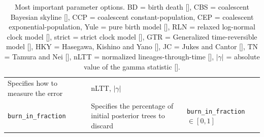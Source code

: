 \begin{table}
\begin{tabular}{|p{3.4cm}|p{9.7cm}|p{4.5cm}@{}|}
    Specifies how to measure the error &
    nLTT, $|\gamma|$ \\
    \verb;burn_in_fraction; &
    Specifies the percentage of initial posterior trees to discard &
    \verb;burn_in_fraction; $\in [0, 1]$\\
    \hline
  \end{tabular}
  \caption{
    Most important parameter options.
    BD = birth death [\cite{nee1994reconstructed}], 
    CBS = coalescent Bayesian skyline [\cite{drummond2005bayesian}], 
    CCP = coalescent constant-population, 
    CEP = coalescent exponential-population,
    Yule = pure birth model [\cite{yule}],
    RLN = relaxed log-normal clock model [\cite{drummond2006relaxed}],
    strict = strict clock model [\cite{zuckerkandl1965molecules}], 
    GTR = Generalized time-reversible model [\cite{tavare1986some}], 
    HKY = Hasegawa, Kishino and Yano [\cite{hasegawa1985dating}], 
    JC = Jukes and Cantor [\cite{jukes1969evolution}], 
    TN = Tamura and Nei [\cite{tamura1993estimation}],
    nLTT = normalized lineages-through-time [\cite{janzen2015approximate}],
    $|\gamma|$ = absolute value of the gamma statistic [\cite{pybus2000testing}].
  }
  \label{tab:options}
\bigskip


\end{table}
